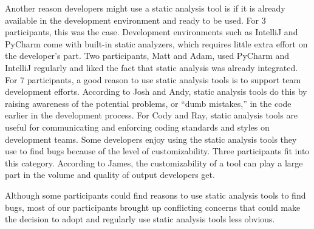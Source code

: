 Another reason developers might use a static analysis tool is if it is already
available in the development environment and ready to be used. For 3 participants, this was the case. 
Development environments such as IntelliJ and
PyCharm come with built-in static analyzers, which requires little extra effort
on the developer's part. Two participants, Matt and Adam, used PyCharm and
IntelliJ regularly and liked the fact that static analysis was already integrated.
For 7 participants, a good reason to use static analysis tools is to
support team development efforts. According to Josh and Andy, static analysis
tools do this by raising awareness of the potential problems, or ``dumb
mistakes,'' in the code earlier in the development process. For Cody and Ray,
static analysis tools are useful for communicating and enforcing coding
standards and styles on development teams. Some developers enjoy using the
static analysis tools they use to find bugs because of the level of
customizability. Three participants fit into this category. According to
James, the customizability of a tool can play a large part in the volume and
quality of output developers get.

Although some participants could find reasons to use static analysis
tools to find bugs, most of our participants brought up conflicting concerns
that could make the decision to adopt and regularly use static analysis tools less
obvious.

